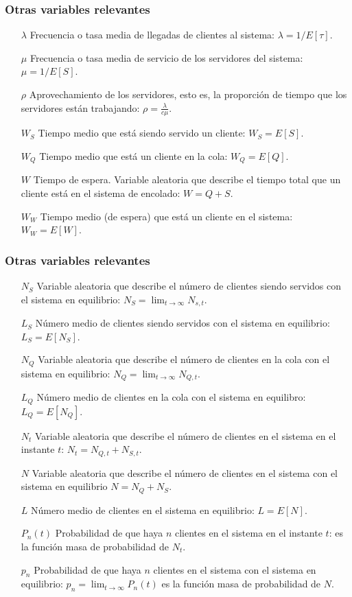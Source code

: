 \documentclass[8pt]{beamer}
\begin{document}
  \begin{frame}\frametitle{Otras variables relevantes}
    \begin{itemize}
    \item [$\lambda$]
      Frecuencia o tasa media de llegadas de clientes al sistema: $\lambda = 1/E[\tau]$.
    \item [$\mu$]
      Frecuencia o tasa media de servicio de los servidores del sistema: $\mu = 1/E[S]$.
    \item [$\rho$]
      Aprovechamiento de los servidores, esto es, la proporción de tiempo que los servidores están trabajando: $\rho = \frac{\lambda}{c\mu}$.
    \item [$W_S$]
      Tiempo medio que está siendo servido un cliente: $W_S  = E[S]$.
    \item [$W_Q$]
      Tiempo medio que está un cliente en la cola: $W_Q = E[Q]$.
    \item [$W$]
      Tiempo de espera. Variable aleatoria que describe el tiempo total que un cliente está en el sistema
      de encolado: $W = Q+S$.
    \item [$W_W$] Tiempo medio (de espera) que está un cliente en el sistema: $W_W = E[W]$.
    \end{itemize}
    \end{frame}
  \begin{frame}\frametitle{Otras variables relevantes}
    \begin{itemize}
    \item [$N_S$]
      Variable aleatoria que describe el número de clientes siendo servidos con el sistema en equilibrio: $N_S = \lim_{t \rightarrow \infty} N_{s,t}$.
    \item [$L_S$]
      Número medio de clientes siendo servidos con el sistema en equilibrio: \\ $L_S = E[N_S]$.
    \item [$N_Q$]
      Variable aleatoria que describe el número de clientes en la cola con el sistema en equilibrio: $N_Q = \lim_{t \rightarrow \infty} N_{Q,t}$.
    \item [$L_Q$]
      Número medio de clientes en la cola con el sistema en equilibro: $L_Q = E[N_Q]$.
    \item [$N_t$]
      Variable aleatoria que describe el número de clientes en el sistema en el instante $t$: $N_t = N_{Q,t} + N_{S,t}$.
    \item [$N$]
      Variable aleatoria que describe el número de clientes en el sistema con el sistema en equilibrio $N = N_Q + N_S$.
    \item [$L$]
      Número medio de clientes en el sistema en equilibrio: $L = E[N]$.
    \item [$P_n(t)$]
      Probabilidad de que haya $n$ clientes en el sistema en el instante $t$: es la función masa de probabilidad de $N_t$.
    \item [$p_n$]
      Probabilidad de que haya $n$ clientes en el sistema con el sistema en equilibrio: $p_n = \lim_{t \rightarrow \infty} P_n(t)$ es la función masa de probabilidad de $N$.
    \end{itemize}
  \end{frame}
\end{document}
